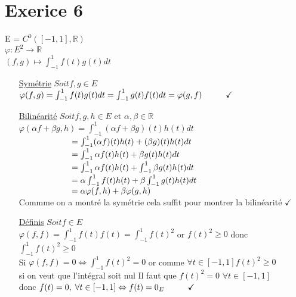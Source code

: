 \documentclass{article}
\author{Frederic Becerril}
\newcommand\tab[1][1cm]{\hspace*{#1}}
\begin{document}
\part*{Exerice 6}

E = $C^0([-1, 1], \mathbb{R})$\\
$\varphi: E^2 \rightarrow \mathbb{R}$\\
$(f, g) \longmapsto \int_{-1}^1 f(t)g(t)dt$
\begin{itemize}
    \item[\underline{Symétrie}] $Soit f, g \in E$\\
$\varphi(f, g) = \int_{-1}^1 f(t)g(t)dt = \int_{-1}^1 g(t)f(t)dt = \varphi(g, f) \tab \checkmark$
    \item[\underline{Bilinéarité}] $Soit f, g, h \in E \mbox{ et } \alpha, \beta \in \mathbb{R}$\\
    $\varphi(\alpha f + \beta g, h) = \int_{-1}^1 (\alpha f + \beta g)(t)h(t)dt$\\
    $\tab[2.2cm]= \int_{-1}^1 (\alpha f)(t)h(t) + (\beta g)(t)h(t)dt$\\
    $\tab[2.2cm]= \int_{-1}^1 \alpha f(t)h(t) + \beta g(t)h(t)dt$\\
    $\tab[2.2cm]= \int_{-1}^1 \alpha f(t)h(t) + \int_{-1}^1 \beta g(t)h(t)dt$\\
    $\tab[2.2cm]= \alpha \int_{-1}^1 f(t)h(t) + \beta \int_{-1}^1 g(t)h(t)dt$\\
    $\tab[2.2cm]= \alpha \varphi(f, h) + \beta \varphi(g, h)$\\
    Commme on a montré la symétrie cela suffit pour montrer la bilinéarité $\checkmark$
    \item[\underline{Définis}] $Soit f \in E$\\
    $\varphi(f, f) = \int_{-1}^1 f(t)f(t) = \int_{-1}^1 f(t)^2$ or $f(t)^2 \geq 0$ donc $ \int_{-1}^1 f(t)^2 \geq 0$\\
    Si $\varphi(f, f) = 0 \Leftrightarrow  \int_{-1}^1 f(t)^2 = 0$ or comme $\forall t \in [-1, 1] f(t)^2 \geq 0$\\
    si on veut que l'intégral soit nul Il faut que $f(t)^2 = 0$ $\forall t \in [-1, 1]$\\
    donc $f(t) = 0, \; \forall t \in [-1, 1] \Leftrightarrow f(t) = 0_E \tab \checkmark$
    
\end{itemize}
\end{document}
